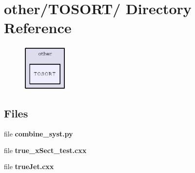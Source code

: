 \section{other/TOSORT/ Directory Reference}
\label{dir_2ebb86094693b99305673e539ff86a40}


\begin{figure}[H]
\begin{center}
\leavevmode
\includegraphics[width=66pt]{dir_2ebb86094693b99305673e539ff86a40_dep}
\end{center}
\end{figure}
\subsection*{Files}
\begin{CompactItemize}
\item 
file \textbf{combine\_\-syst.py}
\item 
file \textbf{true\_\-x\-Sect\_\-test.cxx}
\item 
file \textbf{true\-Jet.cxx}
\end{CompactItemize}

